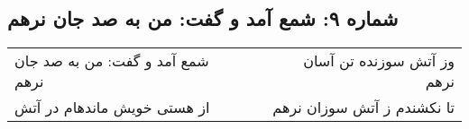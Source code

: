 \begin{center}
\section*{شماره ۹: شمع آمد و گفت: من به صد جان نرهم}
\label{sec:009}
\begin{longtable}{l p{0.5cm} r}
شمع آمد و گفت: من به صد جان نرهم
&&
وز آتش سوزنده تن آسان نرهم
\\
از هستی خویش ماندهام در آتش
&&
تا نکشندم ز آتش سوزان نرهم
\\
\end{longtable}
\end{center}
